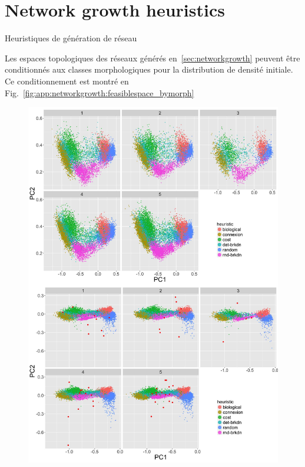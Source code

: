 




\newpage

\section{Network growth heuristics}{Heuristiques de génération de réseau}

\label{app:sec:networkgrowth}

Les espaces topologiques des réseaux générés en~\ref{sec:networkgrowth} peuvent être conditionnés aux classes morphologiques pour la distribution de densité initiale. Ce conditionnement est montré en Fig.~\ref{fig:app:networkgrowth:feasiblespace_bymorph}


\begin{figure}
\includegraphics[width=0.9\linewidth]{Figures/Final/A-networkgrowth-feasiblespace_bymorph}
\end{figure}














